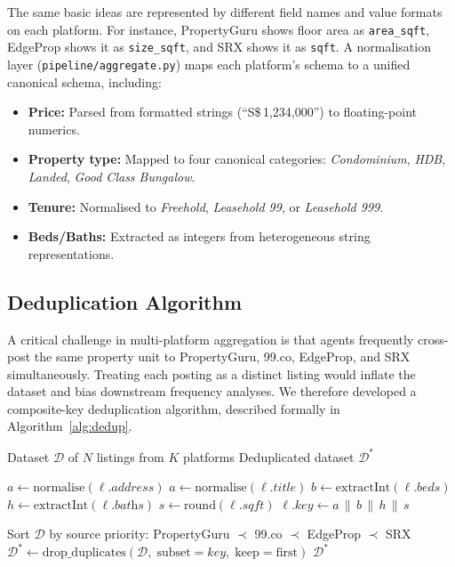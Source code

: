 The same basic ideas are represented by different field names and value formats 
on each platform. For instance, PropertyGuru shows floor area as 
\texttt{area\_sqft}, EdgeProp shows it as \texttt{size\_sqft}, and SRX shows 
it as \texttt{sqft}. A normalisation layer (\texttt{pipeline/aggregate.py})
maps each platform's schema to a unified canonical schema, including:

\begin{itemize}
    \item \textbf{Price:} Parsed from formatted strings (``S\$\,1,234,000'') to floating-point numerics.
    \item \textbf{Property type:} Mapped to four canonical categories: \textit{Condominium}, \textit{HDB}, \textit{Landed}, \textit{Good Class Bungalow}.
    \item \textbf{Tenure:} Normalised to \textit{Freehold}, \textit{Leasehold 99}, or \textit{Leasehold 999}.
    \item \textbf{Beds/Baths:} Extracted as integers from heterogeneous string representations.
\end{itemize}

\subsection{Deduplication Algorithm}
\label{sec:dedup}

A critical challenge in multi-platform aggregation is that agents frequently cross-post the
same property unit to PropertyGuru, 99.co, EdgeProp, and SRX simultaneously.
Treating each posting as a distinct listing would inflate the dataset and bias
downstream frequency analyses. We therefore developed a composite-key deduplication
algorithm, described formally in Algorithm~\ref{alg:dedup}.

\begin{algorithm}
\caption{Multi-Source Listing Deduplication}
\label{alg:dedup}
\begin{algorithmic}[1]
\Require Dataset $\mathcal{D}$ of $N$ listings from $K$ platforms
\Ensure Deduplicated dataset $\mathcal{D}^*$

    \State $a \gets \text{normalise}(\ell.\textit{address})$ 
      
        \State $a \gets \text{normalise}(\ell.\textit{title})$ 
    \EndIf
    \State $b \gets \text{extractInt}(\ell.\textit{beds})$
    \State $h \gets \text{extractInt}(\ell.\textit{baths})$
    \State $s \gets \text{round}(\ell.\textit{sqft})$
    \State $\ell.\textit{key} \gets a \,\|\, b \,\|\, h \,\|\, s$
\EndFor

\State Sort $\mathcal{D}$ by source priority: PropertyGuru $\prec$ 99.co $\prec$ EdgeProp $\prec$ SRX
\State $\mathcal{D}^* \gets \text{drop\_duplicates}(\mathcal{D},\; \text{subset}=\textit{key},\; \text{keep}=\text{first})$
\State \Return $\mathcal{D}^*$
\end{algorithmic}
\end{algorithm}

